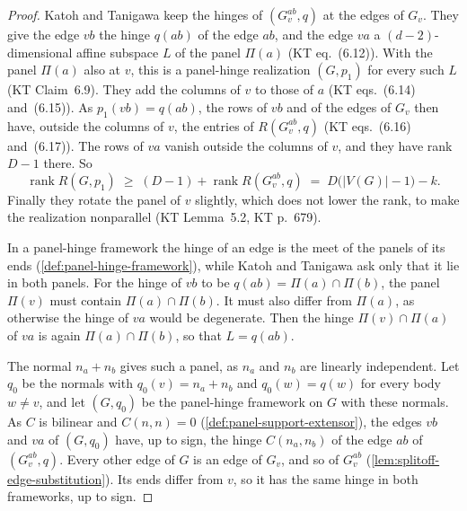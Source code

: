 \begin{proof}
  Katoh and Tanigawa keep the hinges of $(G_v^{ab}, q)$ at the edges of
  $G_v$. They give the edge $vb$ the hinge $q(ab)$ of the edge $ab$, and
  the edge $va$ a $(d-2)$-dimensional affine subspace $L$ of the panel
  $\Pi(a)$ (KT eq.~(6.12)). With the panel $\Pi(a)$ also at $v$, this is
  a panel-hinge realization $(G, p_1)$ for every such $L$ (KT
  Claim~6.9). They add the columns of $v$ to those of $a$ (KT
  eqs.~(6.14) and~(6.15)). As $p_1(vb) = q(ab)$, the rows of $vb$ and of
  the edges of $G_v$ then have, outside the columns of $v$, the entries
  of $R(G_v^{ab}, q)$ (KT eqs.~(6.16) and~(6.17)). The rows of $va$
  vanish outside the columns of $v$, and they have rank $D - 1$ there.
  So
  \[
    \operatorname{rank} R(G, p_1) \;\ge\;
      (D - 1) + \operatorname{rank} R(G_v^{ab}, q)
    \;=\; D\bigl(|V(G)| - 1\bigr) - k.
  \]
  Finally they rotate the panel of $v$ slightly, which does not lower
  the rank, to make the realization nonparallel (KT Lemma~5.2,
  KT p.~679).

  In a panel-hinge framework the hinge of an edge is the meet of the
  panels of its ends (\cref{def:panel-hinge-framework}), while Katoh and
  Tanigawa ask only that it lie in both panels. For the hinge of $vb$
  to be $q(ab) = \Pi(a) \cap \Pi(b)$, the panel $\Pi(v)$ must contain
  $\Pi(a) \cap \Pi(b)$. It must also differ from $\Pi(a)$, as otherwise
  the hinge of $va$ would be degenerate. Then the hinge
  $\Pi(v) \cap \Pi(a)$ of $va$ is again $\Pi(a) \cap \Pi(b)$, so that
  $L = q(ab)$.

  The normal $n_a + n_b$ gives such a panel, as $n_a$ and $n_b$ are
  linearly independent. Let $q_0$ be the normals with
  $q_0(v) = n_a + n_b$ and $q_0(w) = q(w)$ for every body $w \neq v$,
  and let $(G, q_0)$ be the panel-hinge framework on $G$ with these
  normals. As $C$ is bilinear and $C(n,n) = 0$
  (\cref{def:panel-support-extensor}), the edges $vb$ and $va$ of
  $(G, q_0)$ have, up to sign, the hinge $C(n_a, n_b)$ of the edge $ab$
  of $(G_v^{ab}, q)$. Every other edge of $G$ is an edge of $G_v$, and
  so of $G_v^{ab}$ (\cref{lem:splitoff-edge-substitution}). Its ends
  differ from $v$, so it has the same hinge in both frameworks, up to
  sign.


\end{proof}
